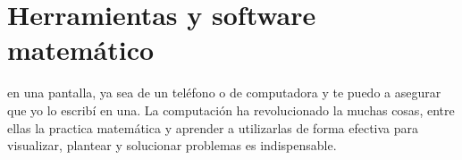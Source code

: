 \chapter{Herramientas y software matemático} %
\label{cha:herramientas_y_software_matematico}

\noindent {} en una
pantalla, ya sea de un teléfono o de computadora y te puedo a asegurar que yo lo
escribí en una. La computación ha revolucionado la muchas cosas, entre ellas la
practica matemática y aprender a utilizarlas de forma efectiva para visualizar,
plantear y solucionar problemas es indispensable.

